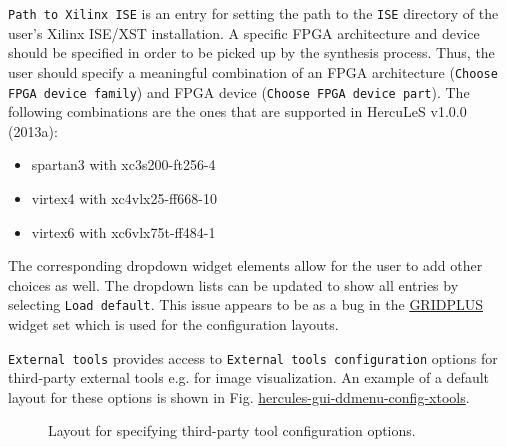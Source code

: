 \documentclass[a4paper]{article}
\begin{document}
\texttt{Path to Xilinx ISE} is an entry for setting the path to the \texttt{ISE} directory of the user's Xilinx ISE/XST installation. A specific FPGA architecture and device should be specified in order to be picked up by the synthesis process. Thus, the user should specify a meaningful combination of an FPGA architecture (\texttt{Choose FPGA device family}) and FPGA device (\texttt{Choose FPGA device part}). The following combinations are the ones that are supported in HercuLeS v1.0.0 (2013a):
%
\begin{itemize}

\item spartan3 with xc3s200-ft256-4

\item virtex4 with xc4vlx25-ff668-10

\item virtex6 with xc6vlx75t-ff484-1

\end{itemize}

The corresponding dropdown widget elements allow for the user to add other choices as well. The dropdown lists can be updated to show all entries by selecting \texttt{Load default}. This issue appears to be as a bug in the \href{http://www.satisoft.com/tcltk/gridplus2/}{GRIDPLUS} widget set which is used for the configuration layouts.

\texttt{External tools} provides access to \texttt{External tools configuration} options for third-party external tools e.g. for image visualization. An example of a default layout for these options is shown in Fig. \hyperref[hercules-gui-ddmenu-config-xtools]{hercules-gui-ddmenu-config-xtools}.
\begin{figure}
\label{hercules-gui-ddmenu-config-xtools}
\noindent{}
\caption{Layout for specifying third-party tool configuration options.}
\end{figure}
\end{document}
